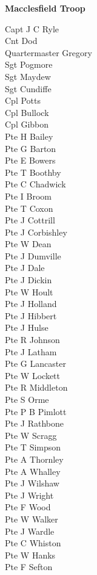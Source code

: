 \begin{center}
  \Large
  \textbf{Macclesfield Troop}
\end{center}

\begin{multicols}{3}
  \small
  \noindent
  Capt J C Ryle \\
  Cnt Dod \\
  Quartermaster Gregory \\
  Sgt Pogmore \\
  Sgt Maydew \\
  Sgt Cundiffe \\
  Cpl Potts \\
  Cpl Bullock \\
  Cpl Gibbon \\
  Pte H Bailey \\
  Pte G Barton \\
  Pte E Bowers \\
  Pte T Boothby \\
  Pte C Chadwick \\
  Pte I Broom \\
  Pte T Coxon \\
  Pte J Cottrill \\
  Pte J Corbishley \\
  Pte W Dean \\
  Pte J Dumville \\
  Pte J Dale \\
  Pte J Dickin \\
  Pte W Hoult \\
  Pte J Holland \\
  Pte J Hibbert \\
  Pte J Hulse \\
  Pte R Johnson \\
  Pte J Latham \\
  Pte G Lancaster \\
  Pte W Lockett \\
  Pte R Middleton \\
  Pte S Orme \\
  Pte P B Pimlott \\
  Pte J Rathbone \\
  Pte W Scragg \\
  Pte T Simpson \\
  Pte A Thornley \\
  Pte A Whalley \\
  Pte J Wilshaw \\
  Pte J Wright \\
  Pte F Wood \\
  Pte W Walker \\
  Pte J Wardle \\
  Pte C Whiston \\
  Pte W Hanks \\
  Pte F Sefton \\
\end{multicols}

